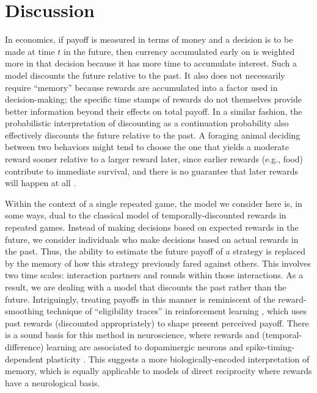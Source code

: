 \documentclass[11pt]{article}
\theoremstyle{plainCl1}
\theoremstyle{plainCl2}
\begin{document}
\section{Discussion}\label{section:discussion}
%
In economics, if payoff is measured in terms of money and a decision is to be made at time $t$ in the future, then currency accumulated early on is weighted more in that decision because it has more time to accumulate interest. Such a model discounts the future relative to the past. It also does not necessarily require ``memory'' because rewards are accumulated into a factor used in decision-making; the specific time stamps of rewards do not themselves provide better information beyond their effects on total payoff. In a similar fashion, the probabilistic interpretation of discounting as a continuation probability \citep{axelrod1981evolution} also effectively discounts the future relative to the past. A foraging animal deciding between two behaviors might tend to choose the one that yields a moderate reward sooner relative to a larger reward later, since earlier rewards (e.g., food) contribute to immediate survival, and there is no guarantee that later rewards will happen at all \citep{stephens1986foraging}.

Within the context of a single repeated game, the model we consider here is, in some ways, dual to the classical model of temporally-discounted rewards in repeated games. Instead of making decisions based on expected rewards in the future, we consider individuals who make decisions based on actual rewards in the past. Thus, the ability to estimate the future payoff of a strategy is replaced by the memory of how this strategy previously fared against others. This involves two time scales: interaction partners and rounds within those interactions. As a result, we are dealing with a model that discounts the past rather than the future. Intriguingly, treating payoffs in this manner is reminiscent of the reward-smoothing technique of ``eligibility traces'' in reinforcement learning \citep{sutton:MIT:2018}, which uses past rewards (discounted appropriately) to shape present perceived payoff. There is a sound basis for this method in neuroscience, where rewards and (temporal-difference) learning are associated to dopaminergic neurons \citep{schultz:JN:1998} and spike-timing-dependent plasticity \citep{dan:Neuron:2004}. This suggests a more biologically-encoded interpretation of memory, which is equally applicable to models of direct reciprocity where rewards have a neurological basis.
\end{document}
